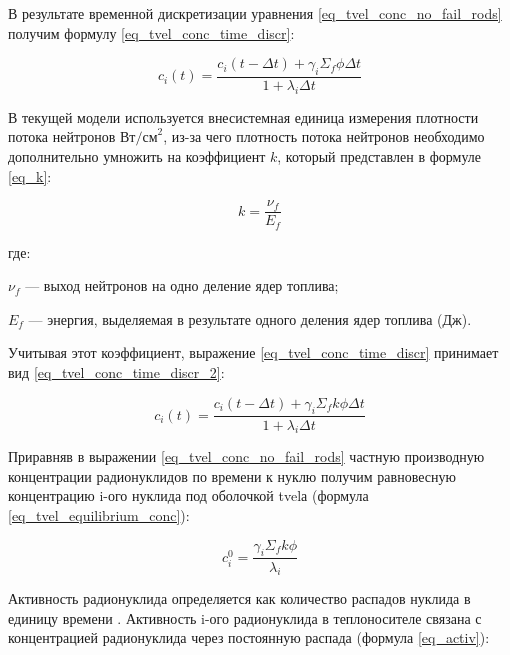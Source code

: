 В результате временной дискретизации уравнения \ref{eq_tvel_conc_no_fail_rods} получим формулу \ref{eq_tvel_conc_time_discr}:

\begin{equation}
    \label{eq_tvel_conc_time_discr}
    c_{i}(t) = \frac{c_{i}(t - \Delta t) + \gamma_{i} \Sigma_{f} \phi \Delta t}{1 + \lambda_{i} \Delta t}
\end{equation}

В текущей модели используется внесистемная единица измерения плотности потока нейтронов $\text{Вт/см}^{2}$, из-за чего 
плотность потока нейтронов необходимо дополнительно умножить на коэффициент $k$, который представлен в формуле 
\ref{eq_k}:

\begin{equation}
    \label{eq_k}
    k = \frac{\nu_{f}}{E_{f}}
\end{equation}

где:
\begin{description}
    \item $\nu_{f}$ --- выход нейтронов на одно деление ядер топлива;
    \item $E_{f}$ --- энергия, выделяемая в результате одного деления ядер топлива (Дж).
\end{description}

Учитывая этот коэффициент, выражение \ref{eq_tvel_conc_time_discr} принимает вид \ref{eq_tvel_conc_time_discr_2}:

\begin{equation}
    \label{eq_tvel_conc_time_discr_2}
    c_{i}(t) = \frac{c_{i}(t - \Delta t) + \gamma_{i} \Sigma_{f} k \phi \Delta t}{1 + \lambda_{i} \Delta t}
\end{equation}

Приравняв в выражении \ref{eq_tvel_conc_no_fail_rods} частную производную концентрации радионуклидов по времени к 
нуклю получим равновесную концентрацию i-ого нуклида под оболочкой \ac{tvel}а (формула \ref{eq_tvel_equilibrium_conc}):

\begin{equation}
    \label{eq_tvel_equilibrium_conc}
    c_{i}^{0} = \frac{\gamma_{i} \Sigma_{f} k \phi}{\lambda_{i}} 
\end{equation}

Активность радионуклида определяется как количество распадов нуклида в единицу времени \cite{gusev_def}. Активность 
i-ого радионуклида в теплоносителе связана с концентрацией радионуклида через постоянную распада (формула 
\ref{eq_activ}):

